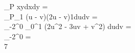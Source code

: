 \iint_P xydxdy =\\
\int_{P_1} (u - v)(2u - v)1dudv =\\
\int_{-2}^0 \int_0^1 (2u^2 - 3uv + v^2) dudv =\\
_{-2}^0 =\\
7